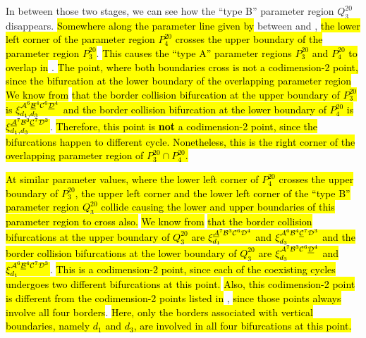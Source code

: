 In between those two stages, we can see how the ``type B'' parameter region $Q^{20}_3$ disappears.
\hl{Somewhere along the parameter line given by}  between  and , \hl{the lower left corner of the parameter region $P^{20}_4$ crosses the upper boundary of the parameter region $P^{20}_3$}.
\hl{This causes the ``type A'' parameter regions $P^{20}_3$ and $P^{20}_4$ to overlap in} .
\hl{
	The point, where both boundaries cross is not a codimension-2 point, since the bifurcation at the lower boundary of the overlapping parameter region
}
\hl{We know from}  \hl{that the border collision bifurcation at the upper boundary of $P^{20}_3$ is $\xi_{d_1, d_3}^{\mathcal{A}^6\underline{\mathcal{B}}^4\mathcal{C}^6\underline{\mathcal{D}}^4}$ and the border collision bifurcation at the lower boundary of $P^{20}_4$ is $\xi_{d_1, d_3}^{\underline{\mathcal{A}}^7\mathcal{B}^3\underline{\mathcal{C}}^7\mathcal{D}^3}$}.
\hl{
	Therefore, this point is \textbf{not} a codimension-2 point, since the bifurcations happen to different cycle.
	Nonetheless, this is the right corner of the overlapping parameter region of $P^{20}_3 \cap P^{20}_4$.
}

\hl{
	At similar parameter values, where the lower left corner of $P^{20}_4$ crosses the upper boundary of $P^{20}_3$, the upper left corner and the lower left corner of the ``type B'' parameter region $Q^{20}_3$ collide causing the lower and upper boundaries of this parameter region to cross also.
}
\hl{We know from}  \hl{that the border collision bifurcations at the upper boundary of $Q^{20}_3$ are $\xi_{d_1}^{\underline{\mathcal{A}}^7\mathcal{B}^3\mathcal{C}^6\mathcal{D}^4}$ and $\xi_{d_3}^{\mathcal{A}^6\mathcal{B}^4\underline{\mathcal{C}}^7\mathcal{D}^3}$ and the border collision bifurcations at the lower boundary of $Q^{20}_3$ are $\xi_{d_3}^{\mathcal{A}^7\mathcal{B}^3\mathcal{C}^6\underline{\mathcal{D}}^4}$ and $\xi_{d_1}^{\mathcal{A}^6\underline{\mathcal{B}}^4\mathcal{C}^7\mathcal{D}^3}$}.
\hl{
	This is a codimension-2 point, since each of the coexisting cycles undergoes two different bifurcations at this point.
}
\hl{Also, this codimension-2 point is different from the codimension-2 points listed in} , \hl{since those points always involve all four borders}.
\hl{
	Here, only the borders associated with vertical boundaries, namely $d_1$ and $d_3$, are involved in all four bifurcations at this point.
}

